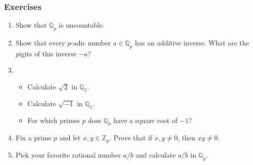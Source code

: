 \documentclass[10pt]{beamer}
\begin{document}
\begin{frame}
    \frametitle{Exercises}

    \begin{enumerate}
        \item Show that \(\mathbb{Q}_p\) is uncountable.
        \item Show that every \(p\)-adic number \(a\in\mathbb{Q}_p\) has an additive inverse.
        What are the \(p\)igits of this inverse \(-a\)?
        \item \begin{itemize}
            \item Calculate \(\sqrt{2}\) in \(\mathbb{Q}_5\).
            \item Calculate \(\sqrt{-1}\) in \(\mathbb{Q}_5\).
            \item For which primes \(p\) does \(\mathbb{Q}_p\) have a square root of \(-1\)?
        \end{itemize}
        \item Fix a prime \(p\) and let \(x,y\in\mathbb{Z}_p\).
        Prove that if \(x,y\neq 0\), then \(xy\neq 0\).
        \item Pick your favorite rational number \(a/b\) and calculate \(a/b\) in \(\mathbb{Q}_p\).
    \end{enumerate}

\end{frame}
\end{document}
